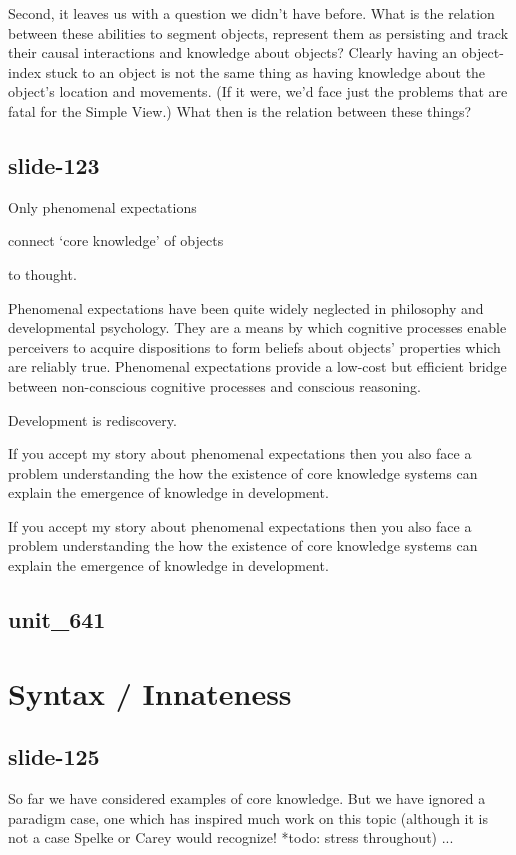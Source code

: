 \documentclass[12pt,\papersize]{extarticle}
\begin{document}
Second, it leaves us with a question we didn't have before.
What is the relation between these abilities to segment objects, represent them as persisting
and track their causal interactions and knowledge about objects?
Clearly having an object-index stuck to an object is not the same thing as having knowledge
about the object's location and movements.  (If it were, we'd face just the problems that are
fatal for the Simple View.)
What then is the relation between these things?

\subsection{slide-123}
Only phenomenal expectations



connect ‘core knowledge’ of objects



to thought.


Phenomenal expectations have been quite widely neglected in philosophy and
developmental psychology.
They are a means by which cognitive processes enable perceivers to
acquire dispositions to form beliefs about objects’ properties which are
reliably true.
Phenomenal expectations provide a low-cost but efficient bridge between
non-conscious cognitive processes and conscious reasoning.

Development is rediscovery.



If you accept my story about phenomenal expectations then
you also face a problem understanding the how the existence of core knowledge
systems can explain the emergence of knowledge in development.


If you accept my story about phenomenal expectations then
you also face a problem understanding the how the existence of core knowledge
systems can explain the emergence of knowledge in development.

\subsection{unit\_641}


\section{Syntax / Innateness}

\subsection{slide-125}
So far we have considered examples of core knowledge.  But we have ignored a paradigm case,
            one which has inspired much work on this topic (although it is not a case Spelke or Carey would recognize! *todo: stress throughout) ...
\end{document}
